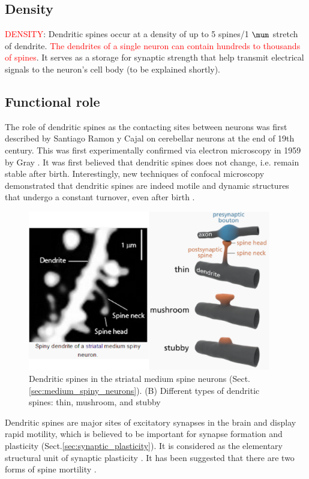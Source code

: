 \subsection{Density}

\textcolor{red}{DENSITY}: Dendritic spines occur at a density of up to 5
spines/1 $\mum$ stretch of dendrite.
 \textcolor{red}{The dendrites of a single neuron can contain hundreds to
thousands of spines}.
It serves as a storage for synaptic strength that help transmit electrical
signals to the neuron's cell body (to be explained shortly).

\subsection{Functional role}

The role of dendritic spines as the contacting sites between neurons was first
described by Santiago Ramon y Cajal on cerebellar neurons at the end of 19th
century. This was first experimentally confirmed via electron microscopy in 
1959 by Gray \citep{gray1959}. It was first believed that dendritic spines does
not change, i.e. remain stable after birth. Interestingly, new techniques of 
confocal microscopy demonstrated that dendritic spines are indeed motile and
dynamic structures that undergo a constant turnover, even after birth
\citep{dailey1996, bonhoeffer2002, yoshihara2009}. 

\begin{figure}[htb]
\centerline{\includegraphics[height=7cm]{./images/dendritic_spines.eps}}
\caption{Dendritic spines in the striatal medium
spine neurons
(Sect.\ref{sec:medium_spiny_neurons}). (B)
Different types of dendritic spines: thin,
mushroom, and stubby}\label{fig:dendritic_spines}
\end{figure} 


Dendritic spines are major sites of excitatory synapses in the brain and display
rapid motility, which is believed to be important for synapse formation and
plasticity (Sect.\ref{sec:synaptic_plasticity}). It is considered as the
elementary structural unit of synaptic plasticity \citep{segal2002}. It has been
suggested that there are two forms of spine mortility \citep{tashiro2004}.  

